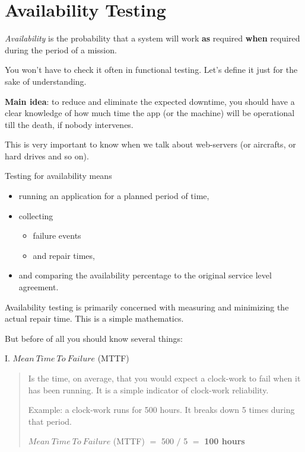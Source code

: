 \section{Availability Testing}
\label{sec:Availability Testing}

\emph{Availability} is the probability that a system will work \textbf{as} required \textbf{when} required during the period of a mission. 

You won't have to check it often in functional testing. Let's define it just for the sake of understanding.

\textbf{Main idea}: to reduce and eliminate the expected downtime, you should have a clear knowledge of how much time the app (or the machine) will be operational till the death, if nobody intervenes.

This is very important to know when we talk about web-servers (or aircrafts, or hard drives and so on).

Testing for availability means 
\begin{itemize}
\item 
running an application for a planned period of time, 
\item 
collecting 
	\begin{itemize}
	\item 
	failure events 
	\item
	and repair times, 
	\end{itemize}
\item 
and comparing the availability percentage to the original service level agreement.                                                                                                                                                                                                                  \end{itemize}

Availability testing is primarily concerned with measuring and minimizing the actual repair time. This is a simple mathematics. 

But before of all you should know several things:

I. $Mean~Time~To~Failure$ (MTTF) 

\begin{quote}
Is the time, on average, that you would expect a clock-work to fail when it has been running. It is a simple indicator of  clock-work reliability.

Example: a clock-work runs for 500 hours. It breaks down 5 times during that period.

$Mean~Time~To~Failure$ (MTTF) $=$ 500 $/$ 5 $=$ \textbf{100 hours}
\end{quote} 

